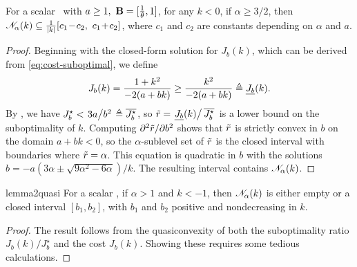 \begin{lemma}
\label{lem:scalar-neighborhood-optimistic}
	For a scalar \DDFproblem\ with $a \geq 1,\ \mathbf{B} = [\frac{1}{\theta}, 1]$,
	for any $k < 0$,
	if $\alpha \geq 3/2$, then
	$\mathscr{N}_{\alpha}(k) \subseteq \frac{1}{|k|} [c_1 \!- \!c_2,\ c_1\! + \!c_2]$,
	where $c_1$ and $c_2$ are constants depending on $\alpha$ and $a$.
\end{lemma}
\begin{proof}
	Beginning with the closed-form solution for $J_b(k)$,
	which can be derived from \eqref{eq:cost-suboptimal},
	we define
	\begin{equation}
	\label{eq:Jbk}
		J_b(k) = \frac{1 + k^2}{-2(a + bk)}
		\geq \frac{k^2}{-2(a + bk)}
		\triangleq \underline{J_b}(k)
		.
	\end{equation}
	By , we have
	\(
		J^\star_b < \left. 3a \middle/ b^2 \right. \triangleq \overline{J^\star_b}
	\),
	so $\tilde r = \left. \underline{J_b}(k) \middle/ \,\overline{J^\star_b} \right.$
	is a lower bound on the suboptimality of $k$.
	Computing $\partial^2 \tilde r / \partial b^2$
	shows that $\tilde r$ is strictly convex in $b$ on the domain $a + bk < 0$,
	so the $\alpha$-sublevel set of $\tilde r$ is the closed interval
	with boundaries where $\tilde r = \alpha$.
	This equation is quadratic in $b$ with the solutions
	\(
		b = -a(3 \alpha \pm \sqrt{9 \alpha^2 - 6 \alpha})/k
	\).
	The resulting interval contains $\mathscr{N}_{\alpha}(k)$.
\end{proof}


\begin{restatable}{lemma2}{quasi}
\label{lem:subopt-convex}
	For a scalar \DDFproblem, if $\alpha > 1$
	and $k < -1$,
	then $\mathscr{N}_{\alpha}(k)$ is either empty or a closed interval
	$[b_1, b_2]$,
	with $b_1$ and $b_2$ positive and nondecreasing in $k$.
\end{restatable}
\begin{proof}
The result follows from the quasiconvexity of
both the suboptimality ratio $J_b(k) / J^\star_b$
and the cost $J_b(k)$.
Showing these requires some tedious calculations.
\end{proof}

